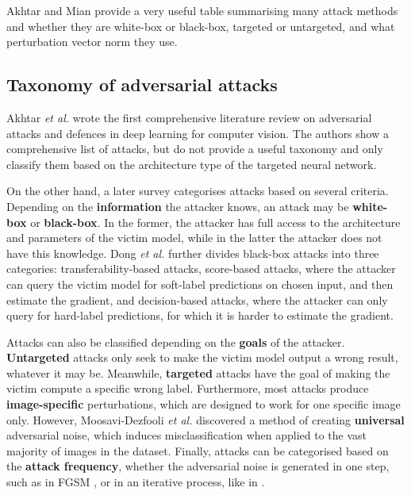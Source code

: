 Akhtar and Mian \cite{akhtar} provide a very useful table summarising many attack methods and whether they are white-box or black-box, targeted or untargeted, and what perturbation vector norm they use.

\subsection{Taxonomy of adversarial attacks}

Akhtar \textit{et al.} \cite{akhtar} wrote the first comprehensive literature review on adversarial attacks and defences in deep learning for computer vision. The authors show a comprehensive list of attacks, but do not provide a useful taxonomy and only classify them based on the architecture type of the targeted neural network. 

On the other hand, a later survey \cite{silva_survey} categorises attacks based on several criteria. Depending on the \textbf{information} the attacker knows, an attack may be \textbf{white-box} or \textbf{black-box}. In the former, the attacker has full access to the architecture and parameters of the victim model, while in the latter the attacker does not have this knowledge. Dong \textit{et al.} \cite{dong2020benchmarking} further divides black-box attacks into three categories: transferability-based attacks, score-based attacks, where the attacker can query the victim model for soft-label predictions on chosen input, and then estimate the gradient, and decision-based attacks, where the attacker can only query for hard-label predictions, for which it is harder to estimate the gradient.

Attacks can also be classified depending on the \textbf{goals} of the attacker. \textbf{Untargeted} attacks only seek to make the victim model output a wrong result, whatever it may be. Meanwhile, \textbf{targeted} attacks have the goal of making the victim compute a specific wrong label. Furthermore, most attacks produce \textbf{image-specific} perturbations, which are designed to work for one specific image only. However, Moosavi-Dezfooli \textit{et al.} \cite{Moosavi-Dezfooli_2017_CVPR} discovered a method of creating \textbf{universal} adversarial noise, which induces misclassification when applied to the vast majority of images in the dataset. Finally, attacks can be categorised based on the \textbf{attack frequency}, whether the adversarial noise is generated in one step, such as in FGSM \cite{fgsm}, or in an iterative process, like in \cite{carlini2017towards}.

